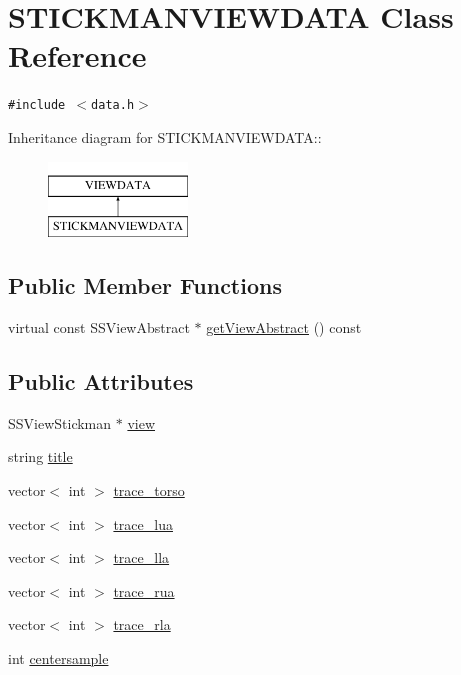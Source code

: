 \hypertarget{class_s_t_i_c_k_m_a_n_v_i_e_w_d_a_t_a}{
\section{STICKMANVIEWDATA Class Reference}
\label{class_s_t_i_c_k_m_a_n_v_i_e_w_d_a_t_a}
}
{\tt \#include $<$data.h$>$}

Inheritance diagram for STICKMANVIEWDATA::\begin{figure}[H]
\begin{center}
\leavevmode
\includegraphics[height=2cm]{class_s_t_i_c_k_m_a_n_v_i_e_w_d_a_t_a}
\end{center}
\end{figure}
\subsection*{Public Member Functions}
\begin{CompactItemize}
\item 
virtual const SSViewAbstract $\ast$ \hyperlink{class_s_t_i_c_k_m_a_n_v_i_e_w_d_a_t_a_609a042318ede3d5379050bfe6945c65}{getViewAbstract} () const 
\end{CompactItemize}
\subsection*{Public Attributes}
\begin{CompactItemize}
\item 
SSViewStickman $\ast$ \hyperlink{class_s_t_i_c_k_m_a_n_v_i_e_w_d_a_t_a_5752ac810d0bd7abc6d2111dd8aa1af7}{view}
\item 
string \hyperlink{class_s_t_i_c_k_m_a_n_v_i_e_w_d_a_t_a_47ccaf35142e15eb15c16e75dd8a541c}{title}
\item 
vector$<$ int $>$ \hyperlink{class_s_t_i_c_k_m_a_n_v_i_e_w_d_a_t_a_4d790edf4557561818fcc772a48130da}{trace\_\-torso}
\item 
vector$<$ int $>$ \hyperlink{class_s_t_i_c_k_m_a_n_v_i_e_w_d_a_t_a_1e62afa43b4eab6af89183c8ad942471}{trace\_\-lua}
\item 
vector$<$ int $>$ \hyperlink{class_s_t_i_c_k_m_a_n_v_i_e_w_d_a_t_a_922547581d0b1509e7cbc1b3f8d9582a}{trace\_\-lla}
\item 
vector$<$ int $>$ \hyperlink{class_s_t_i_c_k_m_a_n_v_i_e_w_d_a_t_a_e2db8d5aa67e6872e4872e9c38490adb}{trace\_\-rua}
\item 
vector$<$ int $>$ \hyperlink{class_s_t_i_c_k_m_a_n_v_i_e_w_d_a_t_a_7a15f72122d91ca427983e60be55b2bd}{trace\_\-rla}
\item 
int \hyperlink{class_s_t_i_c_k_m_a_n_v_i_e_w_d_a_t_a_439f0f54a6d471eee8a190658b1c93e1}{centersample}
\end{CompactItemize}


